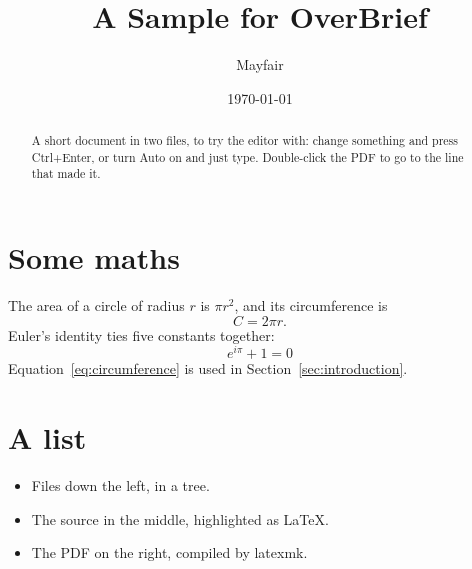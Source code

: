 \documentclass[11pt]{article}
\title{A Sample for OverBrief}
\author{Mayfair}
\date{\today}
\begin{document}
\maketitle

\begin{abstract}
  A short document in two files, to try the editor with: change something and press
  Ctrl+Enter, or turn Auto on and just type. Double-click the PDF to go to the line that made it.
\end{abstract}



\section{Some maths}
\label{sec:maths}

The area of a circle of radius $r$ is $\pi r^2$, and its circumference is
\begin{equation}
  C = 2 \pi r. \label{eq:circumference}
\end{equation}
Euler's identity ties five constants together:
\[
  e^{i\pi} + 1 = 0
\]
Equation~\eqref{eq:circumference} is used in Section~\ref{sec:introduction}.

\section{A list}
\begin{itemize}
  \item Files down the left, in a tree.
  \item The source in the middle, highlighted as LaTeX.
  \item The PDF on the right, compiled by latexmk.
\end{itemize}
\end{document}
